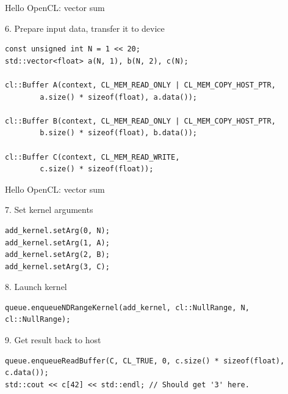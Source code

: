\documentclass[@BEAMER_OPTIONS@]{beamer}
\begin{document}
\begin{frame}[fragile]{Hello OpenCL: vector sum}
    \begin{exampleblock}{6. Prepare input data, transfer it to device}
        \begin{lstlisting}[firstnumber=last]
const unsigned int N = 1 << 20;
std::vector<float> a(N, 1), b(N, 2), c(N);

cl::Buffer A(context, CL_MEM_READ_ONLY | CL_MEM_COPY_HOST_PTR,
        a.size() * sizeof(float), a.data());

cl::Buffer B(context, CL_MEM_READ_ONLY | CL_MEM_COPY_HOST_PTR,
        b.size() * sizeof(float), b.data());

cl::Buffer C(context, CL_MEM_READ_WRITE,
        c.size() * sizeof(float));
        \end{lstlisting}
    \end{exampleblock}
\end{frame}


\begin{frame}[fragile]{Hello OpenCL: vector sum}
    \begin{exampleblock}{7. Set kernel arguments}
        \begin{lstlisting}[firstnumber=last]
add_kernel.setArg(0, N);
add_kernel.setArg(1, A);
add_kernel.setArg(2, B);
add_kernel.setArg(3, C);
        \end{lstlisting}
    \end{exampleblock}
    \begin{exampleblock}{8. Launch kernel}
        \begin{lstlisting}[firstnumber=last]
queue.enqueueNDRangeKernel(add_kernel, cl::NullRange, N, cl::NullRange);
        \end{lstlisting}
    \end{exampleblock}
    \begin{exampleblock}{9. Get result back to host}
        \begin{lstlisting}[firstnumber=last]
queue.enqueueReadBuffer(C, CL_TRUE, 0, c.size() * sizeof(float), c.data());
std::cout << c[42] << std::endl; // Should get '3' here.
        \end{lstlisting}
    \end{exampleblock}
\end{frame}
\end{document}
